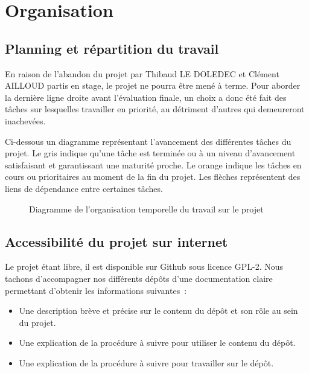 \chapter{Organisation}

\section{Planning et répartition du travail}%

En raison de l'abandon du projet par Thibaud LE DOLEDEC et Clément AILLOUD partis en stage, le projet ne pourra être mené à terme. Pour aborder la dernière ligne droite avant l'évaluation finale, un choix a donc été fait des tâches sur lesquelles travailler en priorité, au détriment d'autres qui demeureront inachevées.

\vspace{1cm}

Ci-dessous un diagramme représentant l’avancement des différentes tâches du projet. Le gris indique qu’une tâche est terminée ou à un niveau d’avancement satisfaisant et garantissant une maturité proche. Le orange indique les tâches en cours ou prioritaires au moment de la fin du projet. Les flèches représentent des liens de dépendance entre certaines tâches.

\begin{figure}[H]
    \centering
    \decoRule
    \caption[
    Diagramme de l'organisation temporelle du travail sur le projet]{
    Diagramme de l'organisation temporelle du travail sur le projet}
    \label{fig:Diagramme de l'organisation temporelle du travail sur le projet}
    \end{figure}


\section{Accessibilité du projet sur internet}

Le projet étant libre, il est disponible sur Github sous licence GPL-2. Nous tachons d'accompagner nos différents dépôts d'une documentation claire permettant d'obtenir les informations suivantes~:
\begin{itemize}[label=$\bullet$]
	\item Une description brève et précise sur le contenu du dépôt et son rôle au sein du projet.
	\item Une explication de la procédure à suivre pour utiliser le contenu du dépôt.
	\item Une explication de la procédure à suivre pour travailler sur le dépôt.
	\end{itemize}

